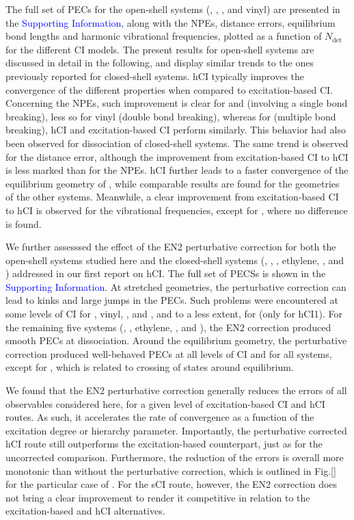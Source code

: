 \documentclass[aip,jcp,reprint,noshowkeys,superscriptaddress]{revtex4-1}
\newcommand{\SupInf}{\textcolor{blue}{Supporting Information}}
\newcommand{\Ndet}{N_\text{det}}
\begin{document}
The full set of PECs for the open-shell systems (, , , and vinyl) are presented in the {\SupInf},
along with the NPEs, distance errors, equilibrium bond lengths and harmonic vibrational frequencies, plotted as a function of $\Ndet$ for the different CI models.
The present results for open-shell systems are discussed in detail in the following,
and display similar trends to the ones previously reported for closed-shell systems. \cite{Kossoski_2022}
hCI typically improves the convergence of the different properties when compared to excitation-based CI.
Concerning the NPEs, such improvement is clear for  and  (involving a single bond breaking), less so for vinyl (double bond breaking),
whereas for  (multiple bond breaking), hCI and excitation-based CI perform similarly.
This behavior had also been observed for dissociation of closed-shell systems. \cite{Kossoski_2022}
The same trend is observed for the distance error, although the improvement from excitation-based CI to hCI is less marked than for the NPEs.
hCI further leads to a faster convergence of the equilibrium geometry of , while comparable results are found for the geometries of the other systems.
Meanwhile, a clear improvement from excitation-based CI to hCI is observed for the vibrational frequencies, except for , where no difference is found.


We further assesssed the effect of the EN2 perturbative correction for both the open-shell systems studied here 
and the closed-shell systems (, , , ethylene, , and ) addressed in our first report on hCI. \cite{Kossoski_2022}
The full set of PECSs is shown in the {\SupInf}.
At stretched geometries, the perturbative correction can lead to kinks and large jumps in the PECs.
Such problems were encountered at some levels of CI for , vinyl, , and , and to a less extent, for  (only for hCI1).
For the remaining five systems (, , ethylene, , and ),
the EN2 correction produced smooth PECs at dissociation.
Around the equilibrium geometry, the perturbative correction produced well-behaved PECs at all levels of CI and for all systems, 
except for , which is related to crossing of states around equilibrium.

We found that the EN2 perturbative correction generally reduces the errors of all observables considered here, for a given level of excitation-based CI and hCI routes.
As such, it accelerates the rate of convergence as a function of the excitation degree or hierarchy parameter.
Importantly, the perturbative corrected hCI route still outperforms the excitation-based counterpart, just as for the uncorrected comparison.
Furthermore, the reduction of the errors is overall more monotonic than without the perturbative correction,
which is outlined in Fig.\ref{} for the particular case of .
For the sCI route, however, the EN2 correction does not bring a clear improvement to render it competitive in relation to the excitation-based and hCI alternatives.
\end{document}
